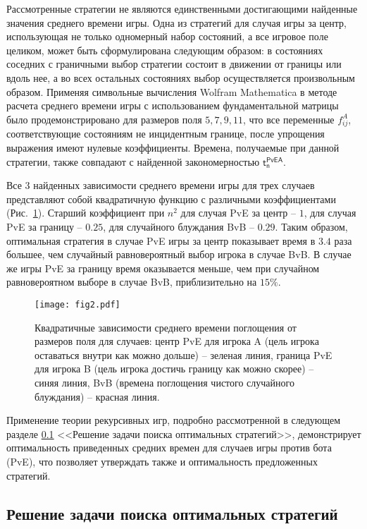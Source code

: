 Рассмотренные стратегии не являются единственными достигающими найденные значения среднего времени игры. Одна из стратегий для случая игры за центр, использующая не только одномерный набор состояний, а все игровое поле целиком, может быть сформулирована следующим образом: в состояниях соседних с граничными выбор стратегии состоит в движении от границы или вдоль нее, а во всех остальных состояниях выбор осуществляется произвольным образом. Применяя символьные вычисления Wolfram Mathematica в методе расчета среднего времени игры с использованием фундаментальной матрицы было продемонстрировано для размеров поля $5, 7, 9, 11$, что все переменные $f_{ij}^A$, соответствующие состояниям не инцидентным границе, после упрощения выражения имеют нулевые коэффициенты. Времена, получаемые при данной стратегии, также совпадают с найденной закономерностью $\boldsymbol{\mathsf{t_n^{PvE A}}}$.

Все 3 найденных зависимости среднего времени игры для трех случаев представляют собой квадратичную функцию с различными коэффициентами (Рис.~\cref{fig:quadratic:time}). Старший коэффициент при $n^2$ для случая PvE за центр -- $1$, для случая PvE за границу -- $0.25$, для случайного блуждания BvB -- $0.29$. Таким образом, оптимальная стратегия в случае PvE игры за центр показывает время в $3.4$ раза большее, чем случайный равновероятный выбор игрока в случае BvB. В случае же игры PvE за границу время оказывается меньше, чем при случайном равновероятном выборе в случае BvB, приблизительно на $15\%$.

\begin{figure}[t]
    \centering
    \texttt{[image: fig2.pdf]}
    \caption{
        Квадратичные зависимости среднего времени поглощения от размеров поля для случаев: центр PvE для игрока A (цель игрока оставаться внутри как можно дольше) -- зеленая линия, граница PvE для игрока B (цель игрока достичь границу как можно скорее) -- синяя линия, BvB (времена поглощения чистого случайного блуждания) -- красная линия.
    }  
    \label{fig:quadratic:time}
\end{figure}

Применение теории рекурсивных игр, подробно рассмотренной в следующем разделе \cref{subsec:ch3/sec3/sub4} <<Решение задачи поиска оптимальных стратегий>>, демонстрирует оптимальность приведенных средних времен для случаев игры против бота (PvE), что позволяет утверждать также и оптимальность предложенных стратегий.

\subsection{Решение задачи поиска оптимальных стратегий}\label{subsec:ch3/sec3/sub4}

